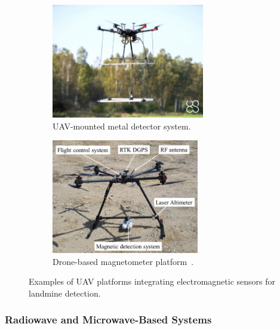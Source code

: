 \begin{figure}[h!]
    \centering
    \begin{subfigure}[b]{0.48\linewidth}
        \centering
        \includegraphics[height=5cm]{figs/Huirui/metal_detector_drone.png}
        \caption{UAV-mounted metal detector system\protect\footnotemark.}
        \label{fig:metal_detector_drone}
    \end{subfigure}
    \hfill
    \begin{subfigure}[b]{0.48\linewidth}
        \centering
        \includegraphics[height=5cm]{figs/Huirui/magnetometer_drone.png}
        \caption{Drone-based magnetometer platform~\cite{yoo2020drone}.}
        \label{fig:magnetometer_drone}
    \end{subfigure}
    \caption{Examples of UAV platforms integrating electromagnetic sensors for landmine detection.}
    \label{fig:emi_uav_examples}
\end{figure}




\subsubsection{Radiowave and Microwave-Based Systems}

